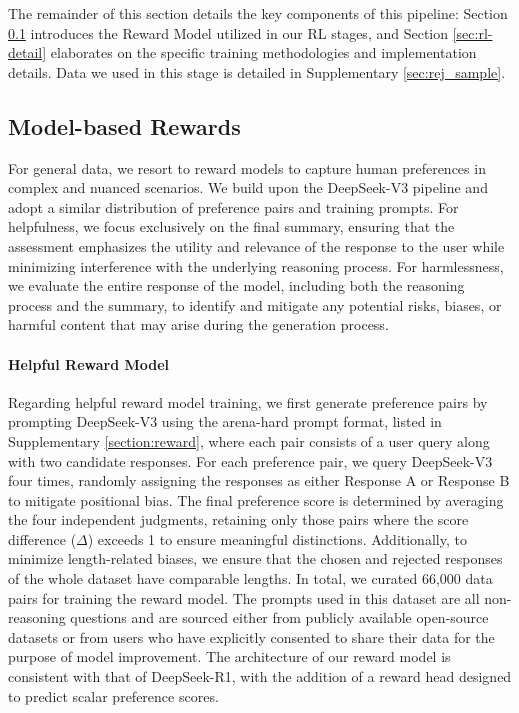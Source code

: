 The remainder of this section details the key components of this pipeline: Section \ref{sec: model_reward} introduces the Reward Model utilized in our RL stages, and Section \ref{sec:rl-detail} elaborates on the specific training methodologies and implementation details. Data we used in this stage is detailed in Supplementary \ref{sec:rej_sample}.

\subsection{Model-based Rewards}\label{sec: model_reward}

For general data, we resort to reward models to capture human preferences in complex and nuanced scenarios. We build upon the DeepSeek-V3 pipeline and adopt a similar distribution of preference pairs and training prompts. For helpfulness, we focus exclusively on the final summary, ensuring that the assessment emphasizes the utility and relevance of the response to the user while minimizing interference with the underlying reasoning process. For harmlessness, we evaluate the entire response of the model, including both the reasoning process and the summary, to identify and mitigate any potential risks, biases, or harmful content that may arise during the generation process.

\paragraph{Helpful Reward Model}

Regarding helpful reward model training, we first generate preference pairs by prompting DeepSeek-V3 using the arena-hard prompt format, listed in Supplementary \ref{section:reward}, where each pair consists of a user query along with two candidate responses. For each preference pair, we query DeepSeek-V3 four times, randomly assigning the responses as either Response A or Response B to mitigate positional bias. The final preference score is determined by averaging the four independent judgments, retaining only those pairs where the score difference ($\Delta$) exceeds 1 to ensure meaningful distinctions. Additionally, to minimize length-related biases, we ensure that the chosen and rejected responses of the whole dataset have comparable lengths. In total, we curated 66,000 data pairs for training the reward model. The prompts used in this dataset are all non-reasoning questions and are sourced either from publicly available open-source datasets or from users who have explicitly consented to share their data for the purpose of model improvement. The architecture of our reward model is consistent with that of DeepSeek-R1, with the addition of a reward head designed to predict scalar preference scores.

